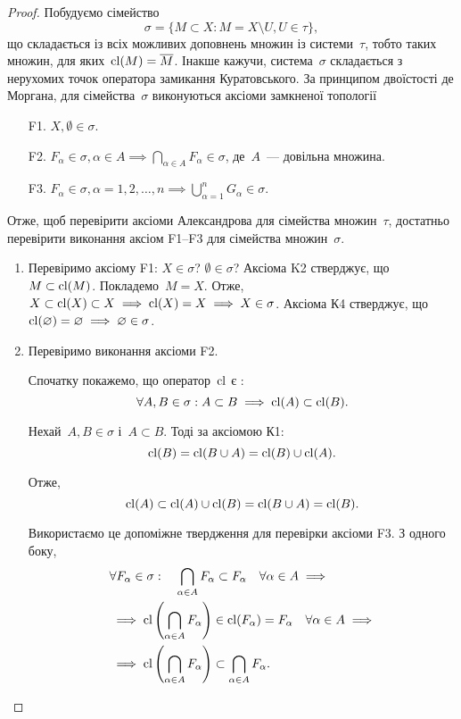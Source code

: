 \begin{proof}
    Побудуємо сімейство \[\sigma = \{ M \subset X: M = X \setminus U, U \in \tau\}, \] що складається із всіх можливих доповнень множин із системи~$\tau$, тобто таких множин, для яких~$\operatorname{cl}(M) = \overline{M}$. Інакше кажучи, система~$\sigma$ складається з нерухомих точок оператора замикання Куратовського. За принципом двоїстості де Моргана, для сімейства~$\sigma$ виконуються аксіоми замкненої топології
    \begin{enumerate}
        \item[F1.] $X, \emptyset \in \sigma$.
        \item[F2.] $F_\alpha \in \sigma, \alpha \in A \implies \bigcap_{\alpha \in A} F_\alpha \in \sigma$, де~$A$~--- довільна множина.
        \item[F3.] $F_\alpha \in \sigma, \alpha = 1, 2, \ldots, n \implies \bigcup_{\alpha = 1}^n G_\alpha \in \sigma$.
    \end{enumerate}

    Отже, щоб перевірити аксіоми Александрова для сімейства множин~$\tau$, достатньо перевірити виконання аксіом F1--F3 для сімейства множин~$\sigma$.
    \begin{enumerate}
        \item Перевіримо аксіому F1: $X \in \sigma$? $\emptyset \in \sigma$? Аксіома K2 стверджує, що~$M \subset \operatorname{cl}(M)$. Покладемо~$M = X$. Отже, $X \subset \operatorname{cl}(X) \subset X \implies \operatorname{cl}(X) = X \implies X \in \sigma$. Аксіома К4 стверджує, що~$\operatorname{cl}(\varnothing) = \varnothing \implies \varnothing \in \sigma$.

        \item Перевіримо виконання аксіоми F2.

        Спочатку покажемо, що оператор~$\operatorname{cl}$ є :
        \[\forall A, B \in \sigma: A \subset B \implies \operatorname{cl}(A) \subset \operatorname{cl}(B).\]

        Нехай~$A, B \in \sigma$ і~$A \subset B$. Тоді за аксіомою К1:
        \[ \operatorname{cl}(B) = \operatorname{cl}(B \cup A) = \operatorname{cl}(B) \cup \operatorname{cl}(A).\]

        Отже, \[ \operatorname{cl}(A) \subset \operatorname{cl}(A) \cup \operatorname{cl}(B) = \operatorname{cl}(B \cup A) = \operatorname{cl}(B). \]

        Використаємо це допоміжне твердження для перевірки аксіоми F3. З одного боку,
        \begin{align*}
        & \forall F_\alpha \in \sigma: \quad \bigcap_{\alpha \in A} F_\alpha \subset F_\alpha \quad \forall \alpha \in A \implies \\
        & \implies \operatorname{cl} \left(\bigcap_{\alpha \in A} F_\alpha \right) \in \operatorname{cl} (F_\alpha) = F_\alpha \quad \forall \alpha \in A \implies \\
        & \implies \operatorname{cl} \left(\bigcap_{\alpha \in A} F_\alpha \right) \subset \bigcap_{\alpha \in A} F_\alpha.
        \end{align*}


\end{enumerate}
\end{proof}
